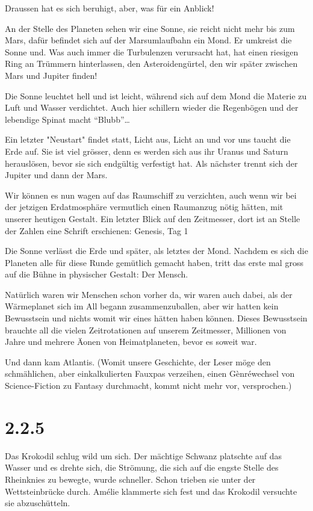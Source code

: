 \documentclass[11pt,titlepage,a5paper]{book}
\begin{document}
Draussen hat es sich beruhigt, aber, was für ein Anblick!

An der Stelle des Planeten sehen wir eine Sonne, sie reicht nicht mehr bis zum Mars, dafür befindet sich auf der Marsumlaufbahn ein Mond. Er umkreist die Sonne und. Was auch immer die Turbulenzen verursacht hat, hat einen riesigen Ring an Trümmern hinterlassen, den Asteroidengürtel, den wir später zwischen Mars und Jupiter finden!

Die Sonne leuchtet hell und ist leicht, während sich auf dem Mond die Materie zu Luft und Wasser verdichtet. Auch hier schillern wieder die Regenbögen und der lebendige Spinat macht "`Blubb"'\dots

Ein letzter "Neustart" findet statt, Licht aus, Licht an und vor uns taucht die Erde auf. Sie ist viel grösser, denn es werden sich aus ihr Uranus und Saturn herauslösen, bevor sie sich endgültig verfestigt hat. Als nächster trennt sich der Jupiter und dann der Mars.

Wir können es nun wagen auf das Raumschiff zu verzichten, auch wenn wir bei der jetzigen Erdatmosphäre vermutlich einen Raumanzug nötig hätten, mit unserer heutigen Gestalt.
Ein letzter Blick auf den Zeitmesser, dort ist an Stelle der Zahlen eine Schrift erschienen: Genesis, Tag 1

Die Sonne verlässt die Erde und später, als letztes der Mond. Nachdem es sich die Planeten alle für diese Runde gemütlich gemacht haben, tritt das erste mal gross auf die Bühne in physischer Gestalt: Der Mensch.

Natürlich waren wir Menschen schon vorher da, wir waren auch dabei, als der Wärmeplanet sich im All begann zusammenzuballen, aber wir hatten kein Bewusstsein und nichts womit wir eines hätten haben können. Dieses Bewusstsein brauchte all die vielen Zeitrotationen auf unserem Zeitmesser, Millionen von Jahre und mehrere Äonen von Heimatplaneten, bevor es soweit war.

Und dann kam Atlantis. (Womit unsere Geschichte, der Leser möge den schmählichen, aber einkalkulierten Fauxpas verzeihen, einen Gènréwechsel von Science-Fiction zu Fantasy durchmacht, kommt nicht mehr vor, versprochen.)

\section*{2.2.5}

Das Krokodil schlug wild um sich. Der mächtige Schwanz platschte auf das Wasser und es drehte sich, die Strömung, die sich auf die engste Stelle des Rheinknies zu bewegte, wurde schneller. Schon trieben sie unter der Wettsteinbrücke durch. Amélie klammerte sich fest und das Krokodil versuchte sie abzuschütteln.
\end{document}
